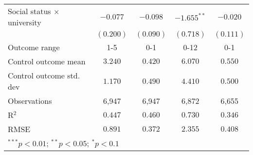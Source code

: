 \begin{table}
\begin{center}
\begin{tabular}{l c c c c}
Social status $\times$ university                   & $-0.077$       & $-0.098$      & $-1.655^{**}$ & $-0.020$      \\
                                                    & $(0.200)$      & $(0.090)$     & $(0.718)$     & $(0.111)$     \\
\hline
Outcome range                                       & 1-5            & 0-1           & 0-12          & 0-1           \\
Control outcome mean                                & $3.240$        & $0.420$       & $6.070$       & $0.550$       \\
Control outcome std. dev                            & $1.170$        & $0.490$       & $4.410$       & $0.500$       \\
Observations                                        & 6,947          & 6,947         & 6,872         & 6,655         \\
R$^{2}$                                             & $0.447$        & $0.460$       & $0.730$       & $0.346$       \\
RMSE                                                & $0.891$        & $0.372$       & $2.355$       & $0.408$       \\
\hline
\multicolumn{5}{l}{\scriptsize{$^{***}p<0.01$; $^{**}p<0.05$; $^{*}p<0.1$}}
\end{tabular}
\caption{}
\label{table:Tables and Figures/SI_table19_allhet_motiv}
\end{center}
\end{table}
